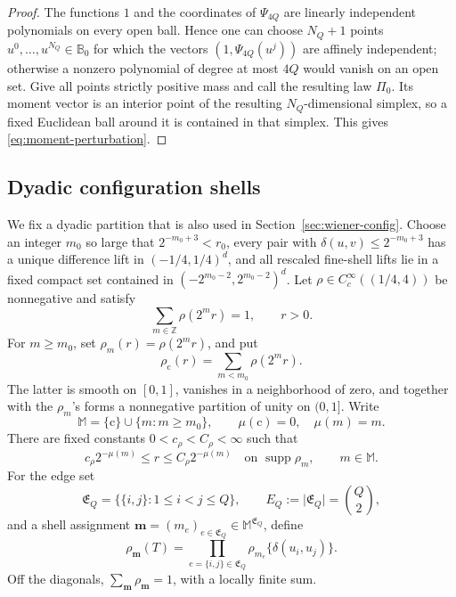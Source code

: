 \documentclass[11pt]{article}
\DeclareMathOperator{\supp}{supp}
\newcommand{\abs}[1]{\lvert #1\rvert}
\begin{document}
\begin{proof}
The functions \(1\) and the coordinates of \(\Psi_{4Q}\) are linearly
independent polynomials on every open ball.  Hence one can choose
\(N_Q+1\) points \(u^0,\ldots,u^{N_Q}\in\mathbb B_0\) for which the vectors
\((1,\Psi_{4Q}(u^j))\) are affinely independent; otherwise a nonzero
polynomial of degree at most \(4Q\) would vanish on an open set.  Give all
points strictly positive mass and call the resulting law \(\Pi_0\).  Its
moment vector is an interior point of the resulting \(N_Q\)-dimensional
simplex, so a fixed Euclidean ball around it is contained in that simplex.
This gives \eqref{eq:moment-perturbation}.
\end{proof}


\subsection{Dyadic configuration shells}

We fix a dyadic partition that is also used in Section~\ref{sec:wiener-config}.  Choose an
integer \(m_0\) so large that \(2^{-m_0+3}<r_0\), every pair with
\(\delta(u,v)\le 2^{-m_0+3}\) has a unique difference lift in
\((-1/4,1/4)^d\), and all rescaled fine-shell lifts lie in a fixed
compact set contained in \((-2^{m_0-2},2^{m_0-2})^d\).  Let \(\rho\in C_c^\infty((1/4,4))\) be nonnegative and
satisfy
\[
 \sum_{m\in\mathbb Z}\rho(2^mr)=1,\qquad r>0.
\]
For \(m\ge m_0\), set \(\rho_m(r)=\rho(2^mr)\), and put
\[
 \rho_{\mathrm c}(r)=\sum_{m<m_0}\rho(2^mr).
\]
The latter is smooth on \([0,1]\), vanishes in a neighborhood of zero, and
together with the \(\rho_m\)'s forms a nonnegative partition of unity on
\((0,1]\).  Write
\[
 \mathbb M=\{\mathrm c\}\cup\{m:m\ge m_0\},
 \qquad
 \mu(\mathrm c)=0,\quad \mu(m)=m.
\]
There are fixed constants \(0<c_\rho<C_\rho<\infty\) such that
\begin{equation}
 c_\rho 2^{-\mu(m)}\le r\le C_\rho2^{-\mu(m)}
 \quad\text{on }\supp\rho_m,
 \qquad m\in\mathbb M.
 \label{eq:dyadic-shell-comparability}
\end{equation}
For the edge set
\[
 \mathfrak E_Q=\{\{i,j\}:1\le i<j\le Q\},
 \qquad E_Q:=\abs{\mathfrak E_Q}=\binom Q2,
\]
and a shell assignment \(\bm m=(m_e)_{e\in\mathfrak E_Q}\in
\mathbb M^{\mathfrak E_Q}\), define
\begin{equation}
 \rho_{\bm m}(T)
 =\prod_{e=\{i,j\}\in\mathfrak E_Q}
   \rho_{m_e}\{\delta(u_i,u_j)\}.
 \label{eq:configuration-shell-partition}
\end{equation}
Off the diagonals, \(\sum_{\bm m}\rho_{\bm m}=1\), with a locally finite
sum.
\end{document}
